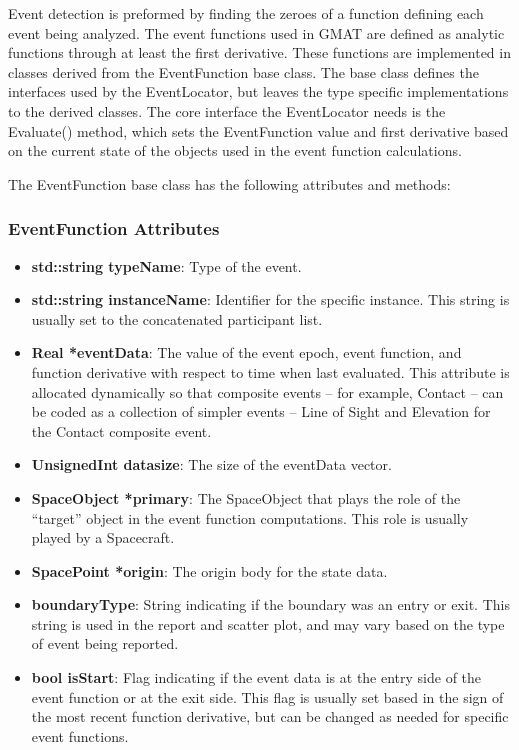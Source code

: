 \documentclass[letterpaper,10pt]{article}
\begin{document}
Event detection is preformed by finding the zeroes of a function defining each
event being analyzed.  The event functions used in GMAT are defined as analytic
functions through at least the first derivative.  These functions are
implemented in classes derived from the EventFunction base class.  The base
class defines the interfaces used by the EventLocator, but leaves the type
specific implementations to the derived classes.  The core interface the
EventLocator needs is the Evaluate() method, which sets the EventFunction value
and first derivative based on the current state of the objects used in the
event function calculations.

The EventFunction base class has the following attributes and methods:

\subsubsection{EventFunction Attributes}

\begin{itemize}
\item \textbf{std::string typeName}: Type of the event.
\item \textbf{std::string instanceName}: Identifier for the specific instance. 
This string is usually set to the concatenated participant list.
\item \textbf{Real *eventData}: The value of the event epoch, event function,
and function derivative with respect to time when last evaluated.  This attribute is allocated dynamically so that composite events -- for example, Contact -- can be coded as a collection of simpler events -- Line of Sight and Elevation for the Contact composite event.
\item \textbf{UnsignedInt datasize}: The size of the eventData vector.
\item \textbf{SpaceObject *primary}: The SpaceObject that plays the role of the
``target'' object in the event function computations.  This role is usually
played by a Spacecraft.
\item \textbf{SpacePoint *origin}: The origin body for the state data.
\item \textbf{boundaryType}: String indicating if the boundary was an entry or
exit.  This string is used in the report and scatter plot, and may vary based on
the type of event being reported.
\item \textbf{bool isStart}: Flag indicating if the event data is at the entry
side of the event function or at the exit side.  This flag is usually set based
in the sign of the most recent function derivative, but can be changed as
needed for specific event functions. 
\end{itemize}
\end{document}
